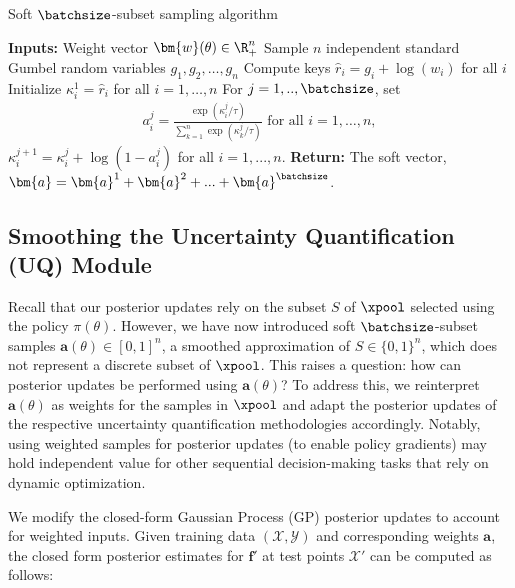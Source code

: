 \begin{algorithm}
\caption{Soft $\batchsize$-subset sampling   algorithm}\label{alg:k-subset}
\begin{algorithmic}[1]
\State \textbf{Inputs:} Weight vector $\bm{w}(\theta) \in \R_+^n$
\State  Sample $n$ independent standard Gumbel random variables $g_1,g_2,\ldots,g_n$
 \State Compute keys $\hat{r}_i = g_i + \log(w_i)$ for all $i$
\State
Initialize $\kappa^1_i = \hat{r}_i$ for all $i=1,\ldots,n$ 
\State  
For $j=1,..,\batchsize$, set
\begin{align*}
    a_i^j = \frac{\exp(\kappa_i^j/\tau)}{\sum_{k=1}^n \exp(\kappa_k^j/\tau)} \text{~for~all~} i=1,\ldots, n,
\end{align*}
$\kappa_i^{j+1} = \kappa_i^{j} + \log(1-a_i^j)$ for all $i=1,...,n$.
\State \textbf{Return:} The soft vector, $\bm{a} = \bm{a}^1+\bm{a}^2+...+\bm{a}^\batchsize$.  
\end{algorithmic}
\end{algorithm}



\subsection{Smoothing the Uncertainty Quantification (UQ) Module} 

Recall that our posterior updates rely on the subset $S$ of $\xpool$ selected using the policy $\pi(\theta)$. 
However, we have now introduced  soft $\batchsize$-subset samples $\bm{a}(\theta) \in [0,1]^n$, a smoothed approximation of $S\in\{0,1\}^n$, which does not represent a discrete subset of $\xpool$. This raises a question: how can posterior updates be performed using $\bm{a}(\theta)$?   
To address this, we reinterpret $\bm{a}(\theta)$ as weights for the  samples in $\xpool$ and adapt the  posterior updates of the respective uncertainty quantification methodologies accordingly. Notably, using weighted samples for posterior updates (to enable policy gradients) may hold independent value for other sequential decision-making tasks that rely on dynamic optimization.

We modify the closed-form Gaussian Process (GP) posterior updates to account for weighted inputs. Given training data $(\mathcal{X}, \mathcal{Y})$ and corresponding weights $\bm{a}$, the closed form posterior estimates for  $\bm{{f}'}$ at test points ${\mathcal{X}}'$ can be computed as follows:

